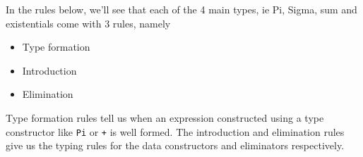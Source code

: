 \documentclass{article}
\begin{document}

In the rules below, we'll see that each of the 4 main types, ie Pi, Sigma, sum
and existentials come with 3 rules, namely
\begin{itemize}[label=$\ast$]
  \item Type formation
  \item Introduction
  \item Elimination
\end{itemize}

Type formation rules tell us when an expression constructed using a type
constructor like \texttt{Pi} or \texttt{+} is well formed.
The introduction and elimination rules give us the typing rules for the data
constructors and eliminators respectively.
\end{document}
